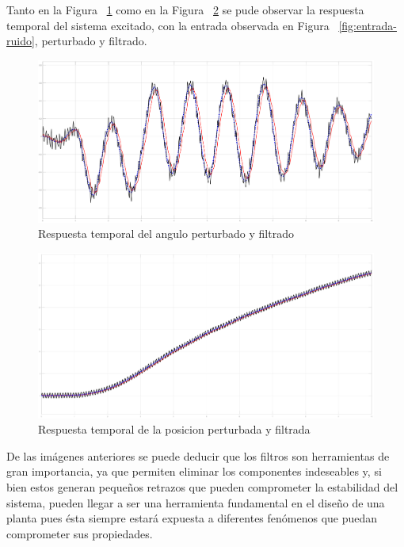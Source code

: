 Tanto en la Figura ~\ref{fig:filtro-angle} como en la Figura ~\ref{fig:filtro-c} se pude observar la
respuesta temporal del sistema excitado, con la entrada observada
en Figura ~\ref{fig:entrada-ruido}, perturbado y filtrado.

\begin{figure}[t]
  \label{fig:filtro-angle}
  \includegraphics[scale=0.15]{Figuras/filtro-angle}
  \caption{Respuesta temporal del angulo perturbado y filtrado} 
\end{figure}

\begin{figure}[t]
  \label{fig:filtro-c}
  \includegraphics[scale=0.15]{Figuras/filtro-c}
  \caption{Respuesta temporal de la posicion perturbada y filtrada} 
\end{figure}

De las imágenes anteriores se puede deducir que los filtros son herramientas de gran importancia, ya que
permiten eliminar los componentes indeseables y, si bien estos generan pequeños retrazos que pueden comprometer
la estabilidad del sistema, pueden llegar a ser una herramienta fundamental en el diseño de una planta
pues ésta siempre estará expuesta a diferentes fenómenos que puedan comprometer sus propiedades.
